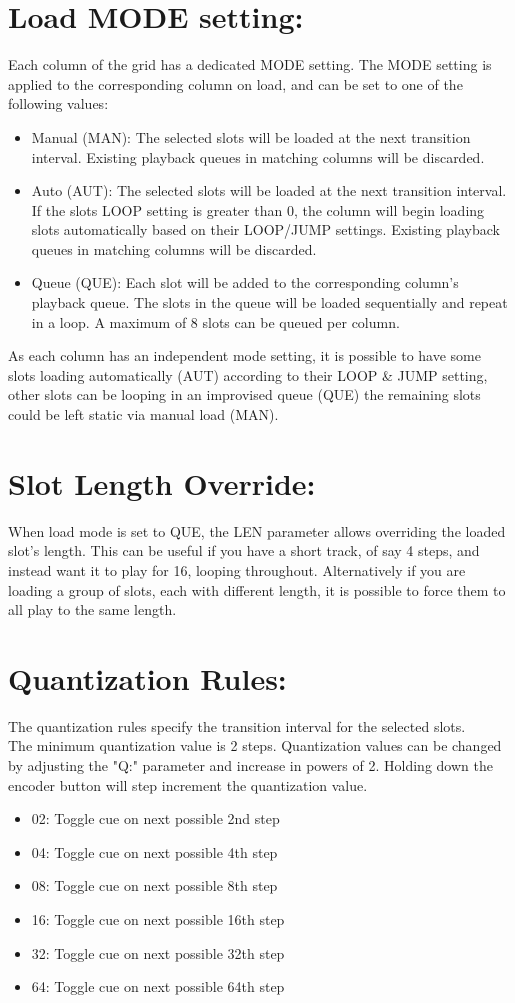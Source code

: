 \section{Load MODE setting:}
Each column of the grid has a dedicated MODE setting. The MODE setting is applied to the corresponding column on load, and can be set to one of the following values:

\begin{itemize}
    \item Manual (MAN):  The selected slots will be loaded at the next transition interval. Existing playback queues in matching columns will be discarded.
    \item Auto (AUT): The selected slots will be loaded at the next transition interval. If the slots LOOP setting is greater than 0, the column will begin loading slots automatically based on their LOOP/JUMP settings. Existing playback queues in matching columns will be discarded.
    \item Queue (QUE): Each slot will be added to the corresponding column's playback queue. The slots in the queue will be loaded sequentially and repeat in a loop. A maximum of 8 slots can be queued per column. 
\end{itemize}

As each column has an independent mode setting, it is possible to have some slots loading automatically (AUT) according to their LOOP \& JUMP setting, other slots can be looping in an improvised queue (QUE) the remaining slots could be left static via manual load (MAN).
\newpage
\section{Slot Length Override:}
When load mode is set to QUE, the LEN parameter allows overriding the loaded slot's length. This can be useful if you have a short track, of say 4 steps, and instead want it to play for 16, looping throughout. Alternatively if you are loading a group of slots, each with different length, it is possible to force them to all play to the same length.

\section{Quantization Rules:}
The quantization rules specify the transition interval for the selected slots.\\
The minimum quantization value is 2 steps. Quantization values can be changed by adjusting the "Q:" parameter and increase in powers of 2. Holding down the encoder button will step increment the quantization value.
\begin{itemize}
\item 02: Toggle cue on next possible 2nd step
\item 04: Toggle cue on next possible 4th step
\item 08: Toggle cue on next possible 8th step 
\item 16: Toggle cue on next possible 16th step 
\item 32: Toggle cue on next possible 32th step 
\item 64: Toggle cue on next possible 64th step
\end{itemize}

